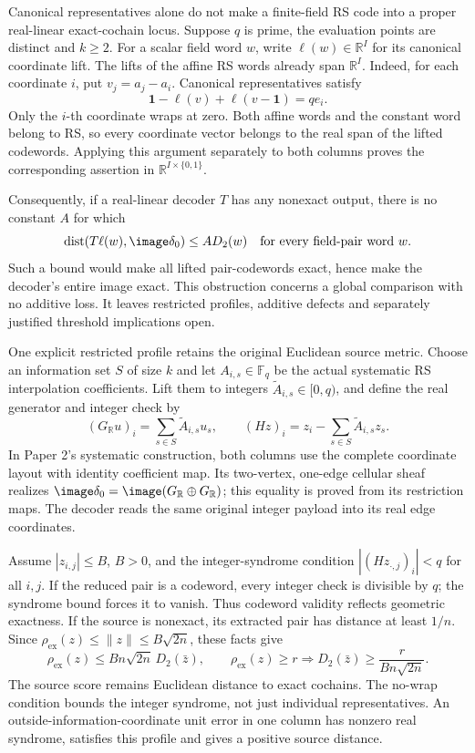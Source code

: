 Canonical representatives alone do not make a finite-field RS code into a
proper real-linear exact-cochain locus. Suppose \(q\) is prime, the evaluation
points are distinct and \(k\ge2\). For a scalar field word \(w\), write
\(\ell(w)\in\mathbb R^I\) for its canonical coordinate lift. The lifts of
the affine RS words already span \(\mathbb R^I\). Indeed, for each coordinate
\(i\), put \(v_j=a_j-a_i\). Canonical representatives satisfy
\[
 \mathbf1-\ell(v)+\ell(v-\mathbf1)=q e_i.
\]
Only the \(i\)-th coordinate wraps at zero. Both affine words and the
constant word belong to RS, so every coordinate vector belongs to the real
span of the lifted codewords. Applying this argument separately to both
columns proves the corresponding assertion in \(\mathbb R^{I\times\{0,1\}}\).

Consequently, if a real-linear decoder \(T\) has any nonexact output, there
is no constant \(A\) for which
\[
 \operatorname{dist}(T\ell(w),\image\delta_0)\le A D_2(w)
 \quad\text{for every field-pair word }w.
\]
Such a bound would make all lifted pair-codewords exact, hence make the
decoder's entire image exact. This obstruction concerns a global comparison
with no additive loss. It leaves restricted profiles, additive defects and
separately justified threshold implications open.

One explicit restricted profile retains the original Euclidean source metric.
Choose an information set \(S\) of size \(k\) and let \(A_{i,s}\in\mathbb F_q\)
be the actual systematic RS interpolation coefficients. Lift them to integers
\(\widetilde A_{i,s}\in[0,q)\), and define the real generator and integer check
by
\[
 (G_{\mathbb R}u)_i=\sum_{s\in S}\widetilde A_{i,s}u_s,
 \qquad (Hz)_i=z_i-\sum_{s\in S}\widetilde A_{i,s}z_s.
\]
In Paper 2's systematic construction, both columns use the complete coordinate
layout with identity coefficient map. Its two-vertex, one-edge cellular sheaf realizes
\(\image\delta_0=\image(G_{\mathbb R}\oplus G_{\mathbb R})\); this equality is
proved from its restriction maps. The decoder reads the same original
integer payload into its real edge coordinates.

Assume \(|z_{i,j}|\le B\), \(B>0\), and the integer-syndrome condition
\(|(Hz_{\cdot,j})_i|<q\) for all \(i,j\). If the reduced pair is a codeword,
every integer check is divisible by \(q\); the syndrome bound forces it to
vanish. Thus codeword validity reflects geometric exactness. If the source is
nonexact, its extracted pair has distance at least \(1/n\). Since
\(\rho_{\mathrm{ex}}(z)\le\|z\|\le B\sqrt{2n}\), these facts give
\[
 \rho_{\mathrm{ex}}(z)\le Bn\sqrt{2n}\,D_2(\bar z),
 \qquad
 \rho_{\mathrm{ex}}(z)\ge r
 \Longrightarrow D_2(\bar z)\ge\frac{r}{Bn\sqrt{2n}}.
\]
The source score remains Euclidean distance to exact cochains. The no-wrap
condition bounds the integer syndrome, not just individual representatives.
An outside-information-coordinate unit error in one column has nonzero real
syndrome, satisfies this profile and gives a positive source distance.

